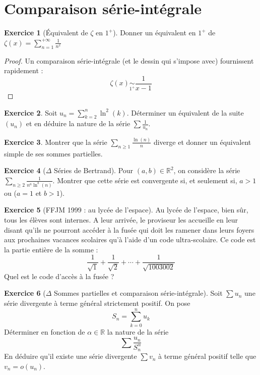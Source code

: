 \documentclass[french]{book}
\newcommand{\R}{\mathbb{R}}
\theoremstyle{definition}
\newtheorem{ex}{Exercice}[chapter]
\theoremstyle{theorem}
\theoremstyle{remark}
\begin{document}
\section{Comparaison série-intégrale}

\begin{ex}[Équivalent de $\zeta$ en $1^+$]
	Donner un équivalent en $1^+$ de $\displaystyle\zeta(x)=\sum_{n=1}^{+\infty}\frac{1}{n^x}$
\end{ex}

\begin{proof}
	Un comparaison série-intégrale (et le dessin qui s'impose avec) fournissent rapidement : $$\zeta(x)\underset{1^+}{\sim}\frac{1}{x-1}$$
\end{proof}

\begin{ex}
	Soit $u_n=\displaystyle\sum_{k=2}^{n}\ln^2(k)$. Déterminer un équivalent de la suite $(u_n)$ et en déduire la nature de la série $\sum\displaystyle\frac{1}{u_n}$.
\end{ex}

\begin{ex}
	Montrer que la série $\displaystyle\sum_{n\geqslant 1}\frac{\ln(n)}{n}$ diverge et donner un équivalent simple de ses sommes partielles.
\end{ex}

\begin{ex}[$\Delta$ Séries de Bertrand]
	Pour $(a,b)\in\R^2$, on considère la série $\displaystyle\sum_{n\geqslant 2}\frac{1}{n^a\ln^b(n)}$. Montrer que cette série est convergente si, et seulement si, $a>1$ ou ($a=1$ et $b>1$).
\end{ex}

\begin{ex}[FFJM 1999 : au lycée de l'espace]
	Au lycée de l'espace, bien sûr, tous les élèves sont internes. A leur arrivée, le proviseur les accueille en leur disant qu'ils ne pourront accéder à la fusée qui doit les ramener dans leurs foyers aux prochaines vacances scolaires qu'à l'aide d'un code ultra-scolaire. Ce code est la partie entière de la somme : $$\frac{1}{\sqrt{1}}+\frac{1}{\sqrt{2}}+\cdots+\frac{1}{\sqrt{1003002}}$$ Quel est le code d'accès à la fusée ?
\end{ex}

\begin{ex}[$\Delta$ Sommes partielles et comparaison série-intégrale]
	Soit $\sum u_n$ une série divergente à terme général strictement positif. On pose $$S_n=\sum_{k=0}^{n}u_k$$ Déterminer en fonction de $\alpha\in\R$ la nature de la série $$\sum\frac{u_n}{S_n^\alpha}$$ En déduire qu'il existe une série divergente $\sum v_n$ à terme général positif telle que $v_n=o(u_n)$.
\end{ex}
\end{document}
